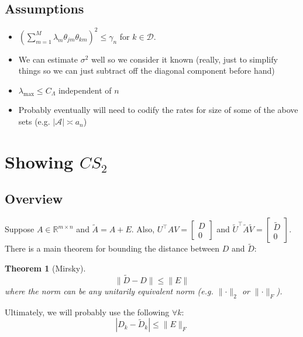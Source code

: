\documentclass[11pt]{article}
\newtheorem{theorem}{Theorem}[section]
\newcommand{\R}{\mathbb{R}}
\newcommand{\norm}[1]{\lVert #1 \rVert}
\newcommand{\A}{\mathcal{A}}
\newcommand{\D}{\mathcal{D}}
\begin{document}
\subsection{Assumptions}
\label{sec:assumptions}

\begin{itemize}
\item $(\sum_{m = 1}^M \lambda_m \theta_{jm} \theta_{km})^2 \leq \gamma_n$ for $k \in \D$.
\item We can estimate $\sigma^2$ well so we consider it known (really, just to simplify things so we can just subtract off the diagonal component before hand)
\item $\lambda_{\max} \leq C_{\Lambda}$ independent of $n$
\item Probably eventually will need to codify the rates for size of some of the above sets (e.g. $|\A| \asymp a_n$)
\end{itemize}

\newpage

\section{Showing $CS_2$}
\subsection{Overview}
Suppose $A \in \R^{m\times n}$ and $\tilde{A} = A + E$.  Also, $U^{\top}AV = \begin{bmatrix} D \\ 0 \end{bmatrix}$ and $\tilde{U}^{\top}\tilde{A}\tilde{V} = \begin{bmatrix} \tilde{D} \\ 0 \end{bmatrix}$.
There is a main theorem for bounding the distance between $D$ and $\tilde{D}$:

\begin{theorem}[Mirsky]
\[
\norm{\tilde{D} - D} \leq \norm{E}
\]
where the norm can be any unitarily equivalent norm (e.g. $\norm{\cdot}_2$ or $\norm{\cdot}_F$).
\label{thm:mirsky}
\end{theorem}

Ultimately, we will probably use the following $\forall k$:
\[
|D_k - \tilde{D}_k | \leq \norm{E}_F
\]
\end{document}
